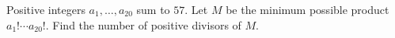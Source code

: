 Positive integers $a_1,\ldots,a_{20}$ sum to $57$. Let $M$ be the minimum possible product $a_1!\cdots a_{20}!$. Find the number of positive divisors of $M$.
